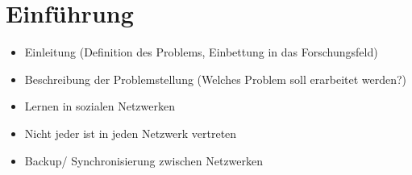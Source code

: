 
\chapter{Einführung} %
\label{cha:einfuehrung}


\begin{itemize}
\item Einleitung (Definition des Problems, Einbettung in das Forschungsfeld)
\item Beschreibung der Problemstellung (Welches Problem soll erarbeitet werden?)
\end{itemize}

\begin{itemize}
    \item Lernen in sozialen Netzwerken
    \item Nicht jeder ist in jeden Netzwerk vertreten
    \item Backup/ Synchronisierung zwischen Netzwerken
\end{itemize}
